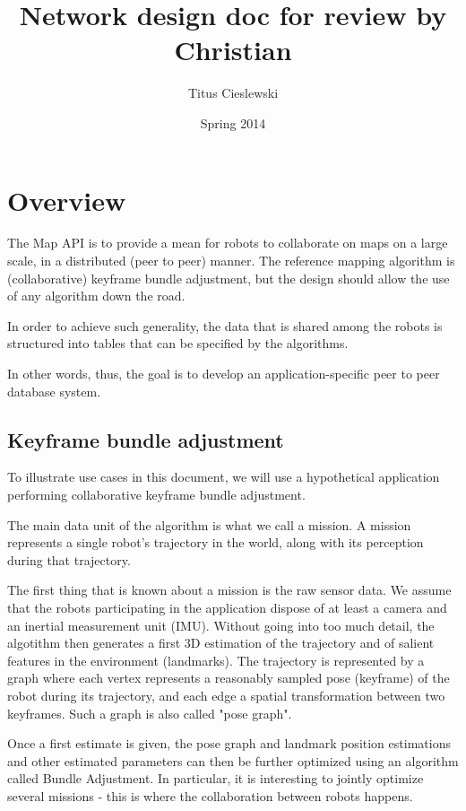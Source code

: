 \documentclass{article}
\title{Network design doc for review by Christian}
\author{Titus Cieslewski}
\date{Spring 2014}
\begin{document}
\maketitle

\section{Overview}

The Map API is to provide a mean for robots to collaborate on maps on a large
scale, in a distributed (peer to peer) manner. The reference mapping algorithm
is (collaborative) keyframe bundle adjustment, but the design should allow the 
use of any algorithm down the road.

In order to achieve such generality, the data that is shared among the robots is
structured into tables that can be specified by the algorithms.

In other words, thus, the goal is to develop an application-specific peer to
peer database system.

\subsection{Keyframe bundle adjustment}

To illustrate use cases in this document, we will use a hypothetical application
performing collaborative keyframe bundle adjustment. 

The main data unit of the algorithm is what we call a mission. A mission
represents a single robot's trajectory in the world, along with its perception
during that trajectory.

The first thing that is known about a mission is the raw sensor data. We assume
that the robots participating in the application dispose of at least a camera
and an inertial measurement unit (IMU). Without going into too much detail, the
algotithm then generates a first 3D estimation of the trajectory and of salient
features in the environment (landmarks). The trajectory is represented by a
graph where each vertex represents a reasonably sampled pose (keyframe) of the
robot during its trajectory, and each edge a spatial transformation between two 
keyframes. Such a graph is also called "pose graph".

Once a first estimate is given, the pose graph and landmark position estimations
and other estimated parameters can then be further optimized using an algorithm
called Bundle Adjustment. In particular, it is interesting to jointly optimize
several missions - this is where the collaboration between robots happens.
\end{document}
